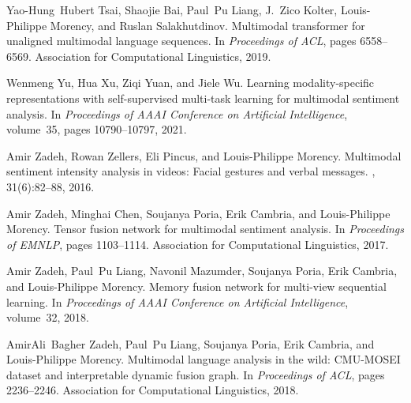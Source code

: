 \documentclass[11pt,twocolumn]{article}
\begin{document}
\begin{thebibliography}{}
Yao-Hung~Hubert Tsai, Shaojie Bai, Paul~Pu Liang, J.~Zico Kolter,
  Louis-Philippe Morency, and Ruslan Salakhutdinov.
\newblock Multimodal transformer for unaligned multimodal language sequences.
\newblock In {\em Proceedings of ACL}, pages 6558--6569. Association for
  Computational Linguistics, 2019.

Wenmeng Yu, Hua Xu, Ziqi Yuan, and Jiele Wu.
\newblock Learning modality-specific representations with self-supervised
  multi-task learning for multimodal sentiment analysis.
\newblock In {\em Proceedings of AAAI Conference on Artificial Intelligence},
  volume~35, pages 10790--10797, 2021.

Amir Zadeh, Rowan Zellers, Eli Pincus, and Louis-Philippe Morency.
\newblock Multimodal sentiment intensity analysis in videos: Facial gestures
  and verbal messages.
, 31(6):82--88, 2016.

Amir Zadeh, Minghai Chen, Soujanya Poria, Erik Cambria, and Louis-Philippe
  Morency.
\newblock Tensor fusion network for multimodal sentiment analysis.
\newblock In {\em Proceedings of EMNLP}, pages 1103--1114. Association for
  Computational Linguistics, 2017.

Amir Zadeh, Paul~Pu Liang, Navonil Mazumder, Soujanya Poria, Erik Cambria, and
  Louis-Philippe Morency.
\newblock Memory fusion network for multi-view sequential learning.
\newblock In {\em Proceedings of AAAI Conference on Artificial Intelligence},
  volume~32, 2018.

AmirAli~Bagher Zadeh, Paul~Pu Liang, Soujanya Poria, Erik Cambria, and
  Louis-Philippe Morency.
\newblock Multimodal language analysis in the wild: {CMU-MOSEI} dataset and
  interpretable dynamic fusion graph.
\newblock In {\em Proceedings of ACL}, pages 2236--2246. Association for
  Computational Linguistics, 2018.

\end{thebibliography}
\end{document}
